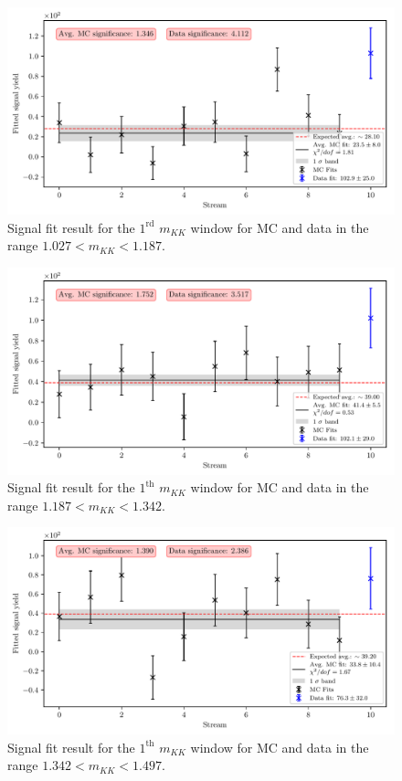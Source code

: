 \begin{figure}[H]
	\centering
	\captionsetup{width=0.8\linewidth}
	\includegraphics[width=\linewidth]{fig/sig_mKK_3}
	\caption{Signal fit result for the $1^{\mathrm{rd}}$ $m_{KK}$ window for MC and data in the range $1.027  < m_{KK} < 1.187$.}
\end{figure}

\begin{figure}[H]
	\centering
	\captionsetup{width=0.8\linewidth}
	\includegraphics[width=\linewidth]{fig/sig_mKK_4}
	\caption{Signal fit result for the $1^{\mathrm{th}}$ $m_{KK}$ window for MC and data in the range $1.187  < m_{KK} < 1.342$.}
\end{figure}

\begin{figure}[H]
	\centering
	\captionsetup{width=0.8\linewidth}
	\includegraphics[width=\linewidth]{fig/sig_mKK_5}
	\caption{Signal fit result for the $1^{\mathrm{th}}$ $m_{KK}$ window for MC and data in the range $1.342  < m_{KK} < 1.497$.}
\end{figure}


